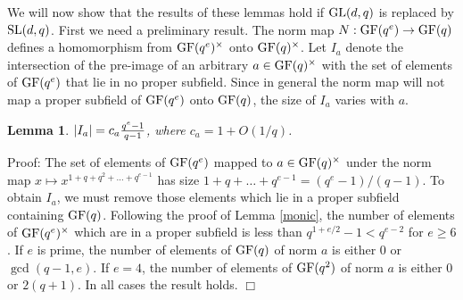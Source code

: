 \documentclass[12pt]{article}
\newtheorem{lemma}[definition]{Lemma}
\newenvironment{proof}{\normalsize {\sc Proof}:}{{\hfill $\Box$ \\}}
\def\SL{{\rm SL}}
\def\GL{{\rm GL}}
\def\GF{{\rm GF}}
\begin{document}
We will now show that the results of these lemmas hold if 
$\GL(d,q)$ is replaced by $\SL(d,q)$. First we need a preliminary
result. The norm map $N:\GF(q^e)\to\GF(q)$ defines a homomorphism from
$\GF(q^e)^\times$ onto $\GF(q)^\times$.  
Let $I_a$ denote the intersection of the pre-image of an arbitrary
$a \in \GF(q)^\times$ with the set of elements of $\GF(q^e)$
that lie in no proper subfield.  
Since in general the norm map will
not map a proper subfield of $\GF(q^e)$ onto $\GF(q)$, 
the size of $I_a$ varies with $a$.  
\begin{lemma}\label{norm}
$\vert I_a\vert=c_a{q^e-1 \over q-1}$, where $c_a=1+O(1/q)$.
\end{lemma}
\begin{proof}
The set of elements of $\GF(q^e)$ mapped to $a\in \GF (q)^\times$ 
under the norm map $x \mapsto x^{1+q+q^2 +\ldots+q^{e-1}}$ 
has size $1+q + \ldots + q^{e - 1} = (q^e-1)/(q - 1)$.
To obtain $I_a$, we must remove those elements 
which lie in a proper subfield containing $\GF(q)$. 
Following the proof of Lemma \ref{monic}, the number of elements 
of $\GF(q^e)^\times$ which
are in a proper subfield is less than $q^{1+e/2} - 1 < q^{e-2}$ for $e \geq 6$.
If $e$ is prime, the number of elements of $\GF(q)$ of norm $a$ is 
either 0 or $\gcd (q - 1, e)$.  If $e = 4$, the number of elements of 
$\GF(q^2)$ of norm $a$ is either 0 or $2(q + 1)$.
In all cases the result holds. 
\end{proof}
\end{document}
